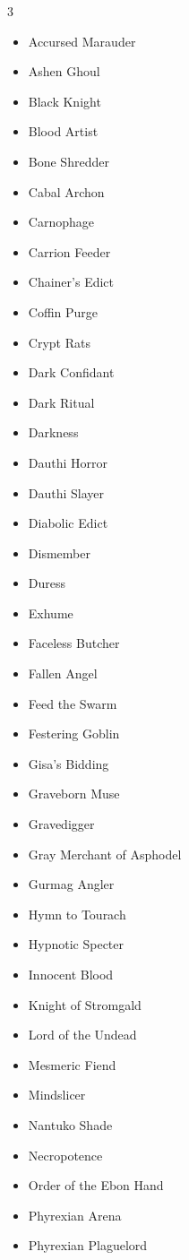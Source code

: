\documentclass[11pt]{article}
\begin{document}
\begin{multicols}{3}
\footnotesize
\begin{itemize}[leftmargin=1em,itemsep=0pt,parsep=0pt]
\item Accursed Marauder
\item Ashen Ghoul
\item Black Knight
\item Blood Artist
\item Bone Shredder
\item Cabal Archon
\item Carnophage
\item Carrion Feeder
\item Chainer's Edict
\item Coffin Purge
\item Crypt Rats
\item Dark Confidant
\item Dark Ritual
\item Darkness
\item Dauthi Horror
\item Dauthi Slayer
\item Diabolic Edict
\item Dismember
\item Duress
\item Exhume
\item Faceless Butcher
\item Fallen Angel
\item Feed the Swarm
\item Festering Goblin
\item Gisa's Bidding
\item Graveborn Muse
\item Gravedigger
\item Gray Merchant of Asphodel
\item Gurmag Angler
\item Hymn to Tourach
\item Hypnotic Specter
\item Innocent Blood
\item Knight of Stromgald
\item Lord of the Undead
\item Mesmeric Fiend
\item Mindslicer
\item Nantuko Shade
\item Necropotence
\item Order of the Ebon Hand
\item Phyrexian Arena
\item Phyrexian Plaguelord

\end{itemize}
\end{multicols}
\end{document}
